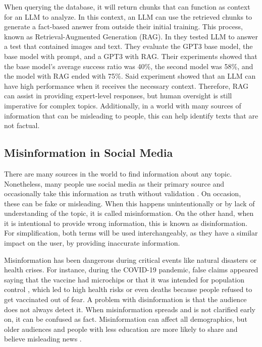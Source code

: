  
When querying the database, it will return chunks that can function as context for an LLM to analyze. In this context, an LLM can use the retrieved chunks to generate a fact-based answer from outside their initial training.
This process, known as Retrieval-Augmented Generation (RAG). In \cite{10683437} they tested LLM to answer a test that contained images and text. They evaluate the GPT3 base model, the base model with prompt,
and a GPT3 with RAG. Their experiments showed that the base model's average success ratio was 40\%, the second model was 58\%, and the model with RAG ended with 75\%. Said experiment showed that
an LLM can have high performance when it receives the necessary context. Therefore, RAG can assist in providing expert-level responses, but human oversight is still imperative for complex topics. Additionally,
in a world with many sources of information that can be misleading to people, this can help identify texts that are not factual. 

\subsection{Misinformation in Social Media}
There are many sources in the world to find information about any topic. Nonetheless, many people use social media as their primary source \cite{socialmedias} and occasionally take this information as truth without
validation \cite{social_fact}. On occasion, these can be fake or misleading. When this happens unintentionally or by lack of understanding of the topic, it is called misinformation. On the other hand,
when it is intentional to provide wrong information, this is known as disinformation. For simplification, both terms will be used interchangeably, as they have a similar impact on the user, by providing inaccurate information.

Misinformation has been dangerous during critical events like natural disasters or health crises. For instance, during the COVID-19 pandemic, false claims appeared saying that the vaccine had
microchips or that it was intended for population control \cite{article_vaccine}, which led to high health risks or even deaths \cite{article} because people refused to get vaccinated out of fear. A problem with disinformation is that the audience
does not always detect it. When misinformation spreads and is not clarified early on, it can be confused as fact. Misinformation can affect all demographics, but older audiences and people with less education are more
likely to share and believe misleading news \cite{encyclopedia3040099}. 

